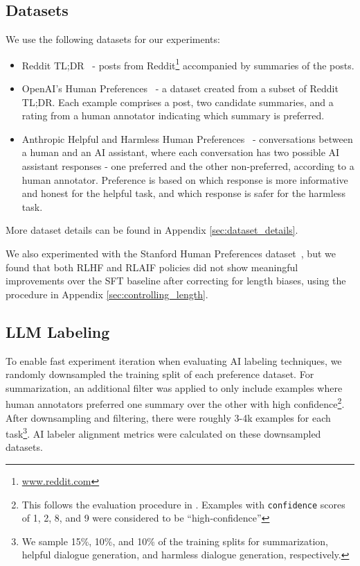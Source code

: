 \documentclass[11pt]{article}
\begin{document}
\subsection{Datasets}
\label{sec:datasets}

We use the following datasets for our experiments:

\begin{itemize}[noitemsep]
    \item Reddit TL;DR~\citep{stiennon2020learning} - posts from Reddit\footnote{\url{www.reddit.com}} accompanied by summaries of the posts.
    \item OpenAI's Human Preferences~\citep{stiennon2020learning} - a dataset created from a subset of Reddit TL;DR. Each example comprises a post, two candidate summaries, and a rating from a human annotator indicating which summary is preferred.
    \item Anthropic Helpful and Harmless Human Preferences~\citep{bai2022training} - conversations between a human and an AI assistant, where each conversation has two possible AI assistant responses - one preferred and the other non-preferred, according to a human annotator. Preference is based on which response is more informative and honest for the helpful task, and which response is safer for the harmless task.
\end{itemize}

\noindent More dataset details can be found in Appendix \ref{sec:dataset_details}.

We also experimented with the Stanford Human Preferences dataset~\citep{pmlr-v162-ethayarajh22a}, but we found that both RLHF and RLAIF policies did not show meaningful improvements over the SFT baseline after correcting for length biases, using the procedure in Appendix \ref{sec:controlling_length}.


\subsection{LLM Labeling}
\label{sec:exp_details_llm_labeling}

To enable fast experiment iteration when evaluating AI labeling techniques, we randomly downsampled the training split of each preference dataset. For summarization, an additional filter was applied to only include examples where human annotators preferred one summary over the other with high confidence\footnote{This follows the evaluation procedure in \citet{stiennon2020learning}. Examples with \texttt{confidence} scores of 1, 2, 8, and 9 were considered to be ``high-confidence''}. After downsampling and filtering, there were roughly 3-4k examples for each task\footnote{We sample 15\%, 10\%, and 10\% of the training splits for summarization, helpful dialogue generation, and harmless dialogue generation, respectively.}. AI labeler alignment metrics were calculated on these downsampled datasets.
\end{document}
